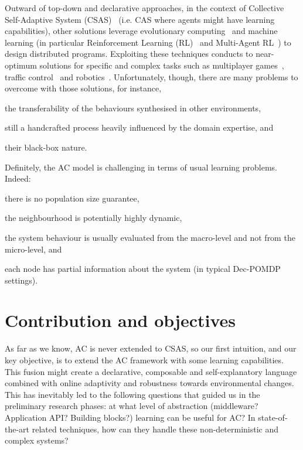 \documentclass[conference]{IEEEtran}
\begin{document}
Outward of top-down and declarative approaches, in the context of Collective Self-Adaptive System (CSAS)~\cite{DBLP:conf/metacognition/Mitchell05} (i.e. CAS where agents might have learning capabilities), other solutions leverage evolutionary computing~\cite{DBLP:journals/swarm/BrambillaFBD13} and machine learning (in particular Reinforcement Learning (RL)~\cite{DBLP:journals/access/NaeemRC20} and Multi-Agent RL~\cite{DBLP:journals/tcyb/NguyenNN20}) to design distributed programs.
%
Exploiting these techniques conducts to near-optimum solutions for specific and complex tasks such as multiplayer games~\cite{DBLP:journals/nature/VinyalsBCMDCCPE19, DBLP:journals/taas/HaoLM15}, traffic control~\cite{DBLP:journals/aes/JinMK17, DBLP:conf/icac/SteinTRH16} and robotics~\cite{DBLP:journals/taas/KraemerB14}.
%
Unfortunately, though, there are many problems to overcome with those solutions, for instance,
\begin{enumerate*}[label=(\roman*)]
    \item the transferability of the behaviours synthesised in other environments, 
    \item still a handcrafted process heavily influenced by the domain expertise, and
    \item their black-box nature.
\end{enumerate*}
%
Definitely, the AC model is challenging in terms of usual learning problems. Indeed:
\begin{enumerate*}[label=(\roman*)]
\item there is no population size guarantee,
\item the neighbourhood is potentially highly dynamic,
\item the system behaviour is usually evaluated from the macro-level and not from the micro-level, and
\item each node has partial information about the system (in typical Dec-POMDP~\cite{DBLP:conf/uai/BernsteinZI00} settings).
\end{enumerate*}
\section{Contribution and objectives}
As far as we know, AC is never extended to CSAS, so our first intuition, and our key objective, is to extend the AC framework with some learning capabilities.
%
This fusion might create a declarative,
composable and self-explanatory language combined with online adaptivity and robustness towards environmental changes.
%
This has inevitably led to the following questions that guided us in the preliminary research phases: 
at what level of abstraction (middleware? Application API? Building blocks?) learning can be useful for AC?
%
In state-of-the-art related techniques, how can they handle these non-deterministic and complex systems?
%
\end{document}
